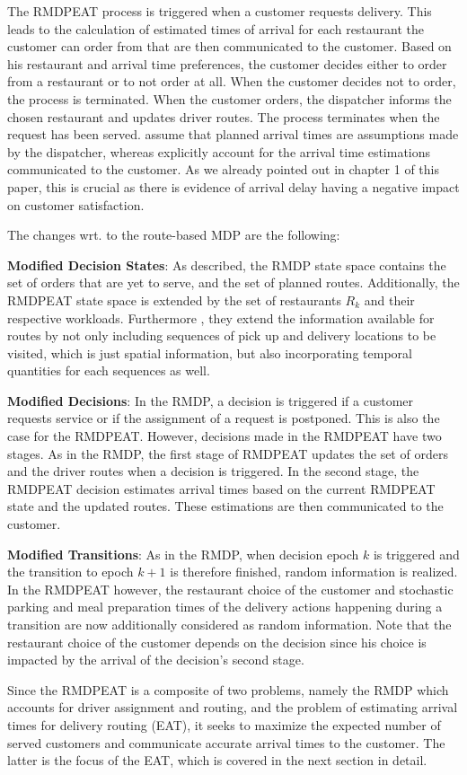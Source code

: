 The RMDPEAT process is triggered when a customer requests delivery. This leads to the calculation of estimated times of arrival for each restaurant the customer can order from that are then communicated to the customer. Based on his restaurant and arrival time preferences, the customer decides either to order from a restaurant or to not order at all. When the customer decides not to order, the process is terminated. When the customer orders, the dispatcher informs the chosen restaurant and updates driver routes. The process terminates when the request has been served. 
\cite{UlmerRMDP} assume that planned arrival times are assumptions made by the dispatcher, whereas \cite{Hildebrandt2020_EAT} explicitly account for the arrival time estimations communicated to the customer. As we already pointed out in chapter 1 of this paper, this is crucial as there is evidence of arrival delay having a negative impact on customer satisfaction.

The changes wrt. to the route-based MDP are the following:
\begin{description}[font=$\bullet$\scshape\bfseries]
	\item \textbf{Modified Decision States}: As described, the RMDP state space contains the set of orders that are yet to serve, and the set of planned routes. Additionally, the RMDPEAT state space is extended by the set of restaurants $ R_k $ and their respective workloads. Furthermore , they extend the information available for routes by not only including sequences of pick up and delivery locations to be visited, which is just spatial information, but also incorporating temporal quantities for each sequences as well. 
	\item \textbf{Modified Decisions}: 
	In the RMDP, a decision is triggered if a customer requests service or if the assignment of a request is postponed. This is also the case for the RMDPEAT. However, decisions made in the RMDPEAT have two stages. As in the RMDP, the first stage of RMDPEAT updates the set of orders and the driver routes when a decision is triggered. In the second stage, the RMDPEAT decision estimates arrival times based on the current RMDPEAT state and the updated routes. These estimations are then communicated to the customer.  
	\item \textbf{Modified Transitions}: As in the RMDP, when decision epoch $ k $ is triggered and the transition to epoch $ k+1 $ is therefore finished, random information is realized. In the RMDPEAT however, the restaurant choice of the customer and stochastic parking and meal preparation times of the delivery actions happening during a transition are now additionally considered as random information. Note that the restaurant choice of the customer depends on the decision since his choice is impacted by the arrival of the decision's second stage.
\end{description}
Since the RMDPEAT is a composite of two problems, namely the RMDP which accounts for driver assignment and routing, and the problem of estimating arrival times for delivery routing (EAT), it seeks to maximize the expected number of served customers and communicate accurate arrival times to the customer. The latter is the focus of the EAT, which is covered in the next section in detail.

